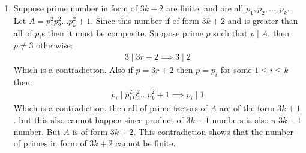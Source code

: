\begin{enumerate}[label=]
    \item  
        Suppose prime number in form of $3k + 2$ are finite. and are all $p_1, p_2, \dots, p_k$.
        Let $A =p_1^2 p_2^2 \dots p_k^2 + 1$. Since this number if of form $3k + 2$ and is greater than all of $p_i$s then it must be composite. Suppose prime $p$ such that $p \mid A$. then $p \ne 3$ otherwise:
        \begin{gather*}
            3 \mid 3r + 2 \implies 3 \mid 2 
        \end{gather*}
        Which is a contradiction. Also if $p = 3r + 2$ then $p = p_i$ for some $1 \le i \le k$ then:
        \begin{gather*}
            p_i \mid p_1^2 p_2^2 \dots p_k^2 + 1 \implies p_i \mid 1
        \end{gather*}
        Which is a contradiction.
        then all of prime factors of $A$ are of the form $3k + 1$. but this also cannot happen since product of $3k + 1$ numbers is also a $3k + 1$ number. But $A$ is of form $3k + 2$. This contradiction shows that the number of primes in form of $3k + 2$ cannot be finite.
\end{enumerate}